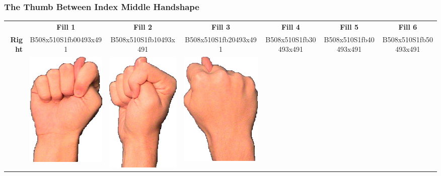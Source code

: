 \documentclass{article}
\begin{document}
\subsubsection{The Thumb Between Index Middle Handshape}

\begin{center}
\begin{tabular}{r*{6}{c}}
&\textbf{Fill 1}&\textbf{Fill 2}&\textbf{Fill 3}&\textbf{Fill 4}&\textbf{Fill 5}&\textbf{Fill 6}\\
\multirow{2}{*}{\textbf{Right}}&
B508x510S1fb00493x491&
B508x510S1fb10493x491&
B508x510S1fb20493x491&
B508x510S1fb30493x491&
B508x510S1fb40493x491&
B508x510S1fb50493x491\\
&
\includegraphics[scale=0.1]{images/10-05-1.jpg}&
\includegraphics[scale=0.1]{images/10-05-2.jpg}&
\includegraphics[scale=0.1]{images/10-05-3.jpg}&

\end{tabular}
\end{center}
\end{document}
